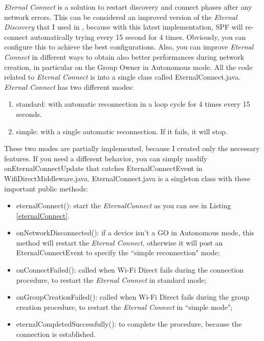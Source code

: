 \emph{Eternal Connect} is a solution to restart discovery and connect phases after any network errors. This can be considered an improved version of the 	\emph{Eternal Discovery} that I used in , because with this latest implementation, SPF will re-connect automatically trying every 15 second for 4 times. Obviously, you can configure this to achieve the best configurations. Also, you can improve \emph{Eternal Connect} in different ways to obtain also better performances during network creation, in particular on the Group Owner in Autonomous mode. All the code related to \emph{Eternal Connect} is into a single class called \textsf{EternalConnect.java}.
\emph{Eternal Connect} has two different modes:
\begin{enumerate}
	\item standard: with automatic reconnection in a loop cycle for 4 times every 15 seconds.
	\item simple: with a single automatic reconnection. If it fails, it will stop.
\end{enumerate}
These two modes are partially implemented, because I created only the necessary features. If you need a different behavior, you can simply modify \textsf{onEternalConnectUpdate} that catches \textsf{EternalConnectEvent} in \textsf{WifiDirectMiddleware.java}. \textsf{EternalConnect.java} is a singleton class with these important public methods:
\begin{itemize}
	\item \textsf{eternalConnect()}: start the \emph{EternalConnect} as you can see in Listing 	\ref{eternalConnect}.
	\item \textsf{onNetworkDisconnected()}: if a device isn't a GO in Autonomous mode, this method will restart the \emph{Eternal Connect}, otherwise it will post an \textsf{EternalConnectEvent} to specify the ``simple reconnection" mode;
	\item \textsf{onConnectFailed()}: called when Wi-Fi Direct fails during the connection procedure, to restart the \emph{Eternal Connect} in standard mode;
	\item \textsf{onGroupCreationFailed()}: called when Wi-Fi Direct fails during the group creation procedure, to restart the \emph{Eternal Connect} in ``simple mode";
	\item \textsf{eternalCompletedSuccessfully()}: to complete the procedure, because the connection is established.
\end{itemize}



